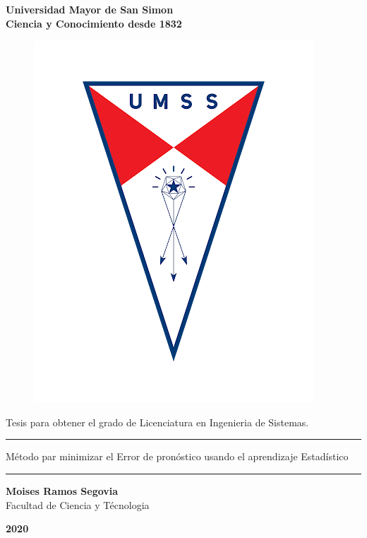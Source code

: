 \begin{titlepage}
	\begin{center}
		{\LARGE \textbf {Universidad Mayor de San Simon}}\\
		\vspace{0.25cm}
		{\large \textbf{Ciencia y Conocimiento desde 1832}}
		\vspace{0.25cm}
		\begin{figure}[h]
			\centering
			\includegraphics[scale=0.25]{imagenes/logo-umss.png}
		\end{figure}
	
		\vspace{1cm}
		
		{\large Tesis para obtener el grado de Licenciatura en Ingenieria de Sistemas.}
		
		\vspace{0.5cm}
		\textcolor{azul}{\rule{165mm}{0.5mm}}
		\vspace{2mm}
		\begin{spacing}{1.5}
			{\large Método par minimizar el Error de pronóstico usando el aprendizaje Estadístico}
		\end{spacing}	
		\vspace{1mm}
		\textcolor{azul}{\rule{165mm}{0.5mm}}
		
		\vspace{2cm}
		
		{\Large \textbf{Moises Ramos Segovia}}\\
		\vspace{5mm}
		{\Large Facultad de Ciencia y Técnologia}\\
		\vfill
		
		{\Huge \textbf{2020}}
	\end{center}
\end{titlepage}